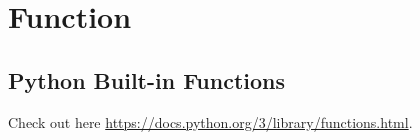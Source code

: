 \documentclass[../main.tex]{subfiles}
\begin{document}

\section{Function}
\subsection{Python Built-in Functions}
Check out here \url{https://docs.python.org/3/library/functions.html}.
\end{document}
